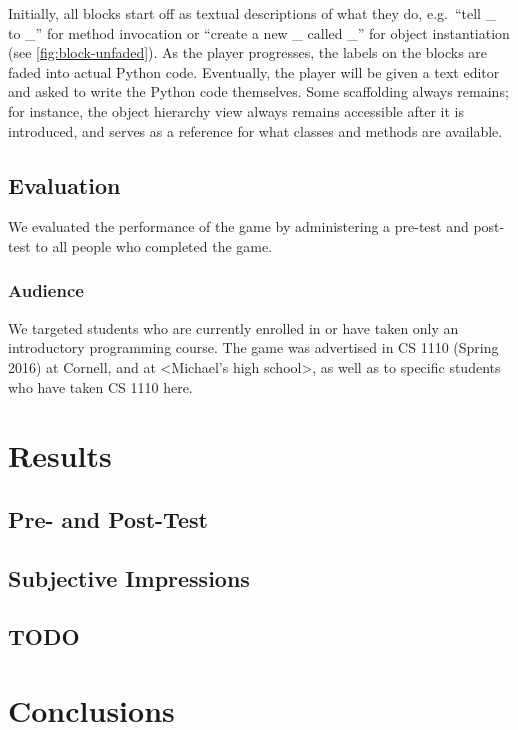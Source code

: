 \documentclass[12pt,notitlepage]{article}
\begin{document}
Initially, all blocks start off as textual descriptions of what they
do, e.g.\ ``tell \_ to \_'' for method invocation or ``create a new \_
called \_'' for object instantiation (see
\autoref{fig:block-unfaded}). As the player progresses, the labels on
the blocks are faded into actual Python code. Eventually, the player
will be given a text editor and asked to write the Python code
themselves. Some scaffolding always remains; for instance, the object
hierarchy view always remains accessible after it is introduced, and
serves as a reference for what classes and methods are available.

\subsection{Evaluation}

We evaluated the performance of the game by administering a pre-test
and post-test to all people who completed the game.

\subsubsection{Audience}

We targeted students who are currently enrolled in or have taken only
an introductory programming course. The game was advertised in CS 1110
(Spring 2016) at Cornell, and at <Michael's high school>, as well as
to specific students who have taken CS 1110 here.

\section{Results}

\subsection{Pre- and Post-Test}

\subsection{Subjective Impressions}

\subsection{TODO}

\section{Conclusions}
\end{document}
